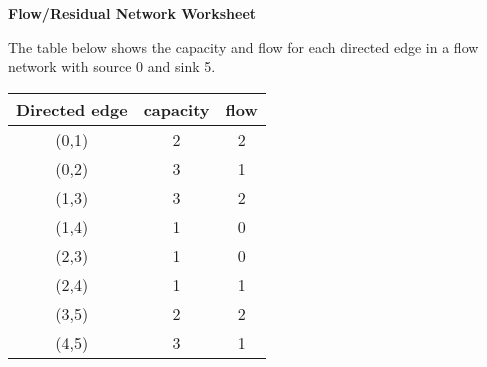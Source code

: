 \documentclass[12pt]{article}
\begin{document}
\newcommand{\I}{\mbox{{\em Int}}}
\newcommand{\lt}{\mbox{{\em left}}}
\newcommand{\rt}{\mbox{{\em right}}}
\newcommand{\ld}{\Delta^l}
\newcommand{\rd}{\Delta^r}
\newcommand{\lsp}[1]{\large\renewcommand{\baselinestretch}{#1}\normalsize}
\newcommand{\hsp}{\hspace{.2in}}

\def\Endwhile{\mbox{\bf endwhile\ }}
\def\Or{\mbox{\bf or\ }}
\def\Do{\mbox{\bf do\ }}
\def\Downto{\mbox{\bf downto\ }}
\def\Int{\mbox{\bf int\ }}
\def\To{\mbox{\bf to\ }}
\def\Repeat{\mbox{\bf repeat\ }}
\def\Until{\mbox{\bf until\ }}
\def\Return{\mbox{\bf return\ }}
\def\Not{\mbox{\bf not\ }}
\def\And{\mbox{\bf and\ }}
\def\For{\mbox{\bf for\ }}
\def\Foreach{\mbox{\bf foreach\ }}
\def\Else{\mbox{\bf else\ }}
\def\Elseif{\mbox{\bf elseif\ }}
\def\End{\mbox{\bf end\ }}
\def\If{\mbox{\bf if\ }}
\def\Mod{\mbox{\bf \ mod\ }}
\def\Then{\mbox{\bf then\ }}
\def\While{\mbox{\bf while\ }}
\def\Output{\mbox{\bf output\ }}

\lsp{1}
\pagestyle{plain}
\begin{center}
    {\bf
        Flow/Residual Network Worksheet
    }
\end{center}

The table below shows the capacity and flow for each directed edge in a
flow network with source 0 and sink 5.

\begin{table}[h]
    \center
    \begin{tabular}{|c|c|c|} \hline
        Directed edge & capacity & flow \\ \hline
        (0,1)         & 2        & 2    \\
        (0,2)         & 3        & 1    \\
        (1,3)         & 3        & 2    \\
        (1,4)         & 1        & 0    \\
        (2,3)         & 1        & 0    \\
        (2,4)         & 1        & 1    \\
        (3,5)         & 2        & 2    \\
        (4,5)         & 3        & 1    \\ \hline
    \end{tabular}
\end{table}
\end{document}
